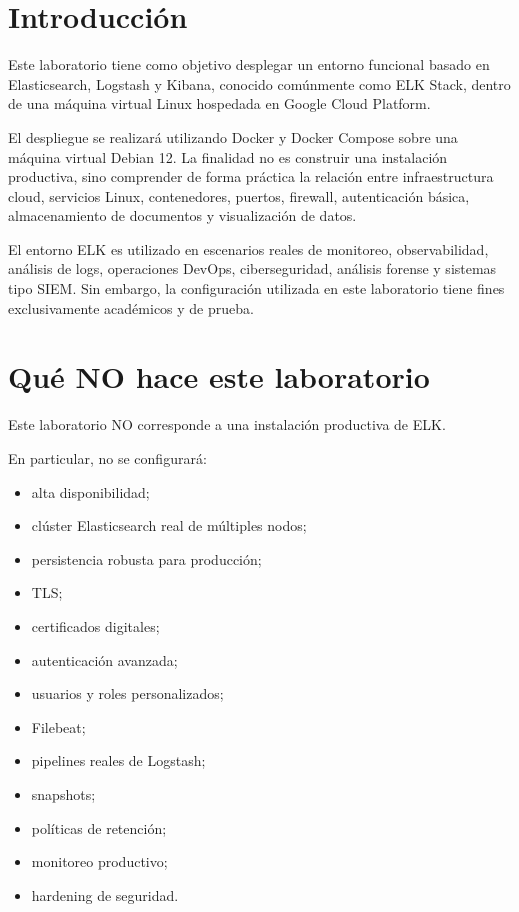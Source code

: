 \documentclass[
  coursetitle={Cómputo Nube y Tecnologías Emergentes},
  coursehours={96},
  coursedate={Verano 2026},
  doctype={Laboratorio},
  otherlangs={english,french},
  authorname={Lázaro},
  authorsurname={Bustio-Martínez},
  authortitle={PhD},
  role={Profesor Investigador},
  email={lbustio@inaoe.mx},
  phone={5559504000},
  ext={7459},
  institution={Instituto Nacional de Astrofísica, Óptica y Electrónica (INAOE)},
  department={Maestría en Ciencias en Tecnologías de Seguridad},
  address={Luis Enrique Erro 1, Sta. Ma. Tonantzintla, San Andrés Cholula, CP 72840, Puebla, México},
  margin={0.5in}
]{../../lbustio_lecture_notes}
\begin{document}
\IberoCover

\section{Introducción}

Este laboratorio tiene como objetivo desplegar un entorno funcional basado en Elasticsearch, Logstash y Kibana, conocido comúnmente como ELK Stack, dentro de una máquina virtual Linux hospedada en Google Cloud Platform.

El despliegue se realizará utilizando Docker y Docker Compose sobre una máquina virtual Debian 12. La finalidad no es construir una instalación productiva, sino comprender de forma práctica la relación entre infraestructura cloud, servicios Linux, contenedores, puertos, firewall, autenticación básica, almacenamiento de documentos y visualización de datos.

El entorno ELK es utilizado en escenarios reales de monitoreo, observabilidad, análisis de logs, operaciones DevOps, ciberseguridad, análisis forense y sistemas tipo SIEM. Sin embargo, la configuración utilizada en este laboratorio tiene fines exclusivamente académicos y de prueba.

\section{Qué NO hace este laboratorio}

Este laboratorio NO corresponde a una instalación productiva de ELK.

En particular, no se configurará:

\begin{itemize}
    \item alta disponibilidad;
    \item clúster Elasticsearch real de múltiples nodos;
    \item persistencia robusta para producción;
    \item TLS;
    \item certificados digitales;
    \item autenticación avanzada;
    \item usuarios y roles personalizados;
    \item Filebeat;
    \item pipelines reales de Logstash;
    \item snapshots;
    \item políticas de retención;
    \item monitoreo productivo;
    \item hardening de seguridad.
\end{itemize}
\end{document}
